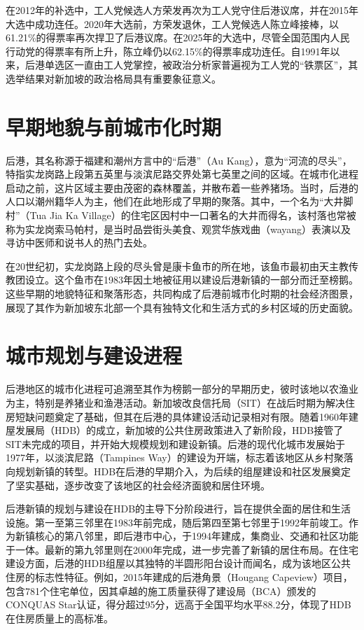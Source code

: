 \documentclass[11pt,a4paper,twoside,openany]{book}
\begin{document}
在2012年的补选中，工人党候选人方荣发再次为工人党守住后港议席，并在2015年大选中成功连任。2020年大选前，方荣发退休，工人党候选人陈立峰接棒，以61.21\%的得票率再次捍卫了后港议席。在2025年的大选中，尽管全国范围内人民行动党的得票率有所上升，陈立峰仍以62.15\%的得票率成功连任。自1991年以来，后港单选区一直由工人党掌控，被政治分析家普遍视为工人党的“铁票区”，其选举结果对新加坡的政治格局具有重要象征意义。

\section{早期地貌与前城市化时期}
后港，其名称源于福建和潮州方言中的“后港”（Au Kang），意为“河流的尽头”，特指实龙岗路上段第五英里与淡滨尼路交界处第七英里之间的区域。在城市化进程启动之前，这片区域主要由茂密的森林覆盖，并散布着一些养猪场。当时，后港的人口以潮州籍华人为主，他们在此地形成了早期的聚落。其中，一个名为“大井脚村”（Tua Jia Ka Village）的住宅区因村中一口著名的大井而得名，该村落也常被称为实龙岗索马帕村，是当时品尝街头美食、观赏华族戏曲（wayang）表演以及寻访中医师和说书人的热门去处。

在20世纪初，实龙岗路上段的尽头曾是康卡鱼市的所在地，该鱼市最初由天主教传教团设立。这个鱼市在1983年因土地被征用以建设后港新镇的一部分而迁至榜鹅。这些早期的地貌特征和聚落形态，共同构成了后港前城市化时期的社会经济图景，展现了其作为新加坡东北部一个具有独特文化和生活方式的乡村区域的历史面貌。

\section{城市规划与建设进程}
后港地区的城市化进程可追溯至其作为榜鹅一部分的早期历史，彼时该地以农渔业为主，特别是养猪业和渔港活动。新加坡改良信托局（SIT）在战后时期为解决住房短缺问题奠定了基础，但其在后港的具体建设活动记录相对有限。随着1960年建屋发展局（HDB）的成立，新加坡的公共住房政策进入了新阶段，HDB接管了SIT未完成的项目，并开始大规模规划和建设新镇。后港的现代化城市发展始于1977年，以淡滨尼路（Tampines Way）的建设为开端，标志着该地区从乡村聚落向规划新镇的转型。HDB在后港的早期介入，为后续的组屋建设和社区发展奠定了坚实基础，逐步改变了该地区的社会经济面貌和居住环境。

后港新镇的规划与建设在HDB的主导下分阶段进行，旨在提供全面的居住和生活设施。第一至第三邻里在1983年前完成，随后第四至第七邻里于1992年前竣工。作为新镇核心的第八邻里，即后港市中心，于1994年建成，集商业、交通和社区功能于一体。最新的第九邻里则在2000年完成，进一步完善了新镇的居住布局。在住宅建设方面，后港的HDB组屋以其独特的半圆形阳台设计而闻名，成为该地区公共住房的标志性特征。例如，2015年建成的后港角景（Hougang Capeview）项目，包含781个住宅单位，因其卓越的施工质量获得了建设局（BCA）颁发的CONQUAS Star认证，得分超过95分，远高于全国平均水平88.2分，体现了HDB在住房质量上的高标准。
\end{document}
